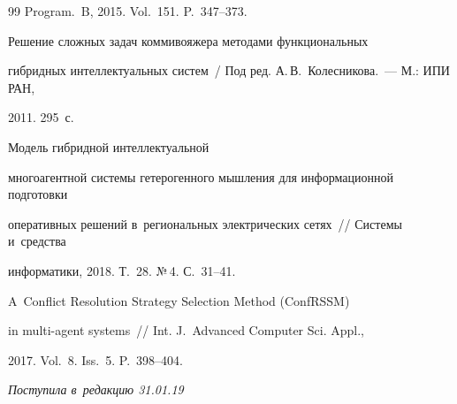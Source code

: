 {{\begin{thebibliography}{99}
  Program.~B, 2015. Vol.~151. P.~347--373.




   Решение сложных задач коммивояжера методами функциональных 


гиб\-рид\-ных интеллектуальных систем~/ Под ред. А.\,В.~Колесникова.~--- М.: ИПИ РАН, 


2011. 295~с.




   Модель гибридной интеллектуальной 


многоагентной системы гетерогенного мышления для информационной подготовки 


оперативных решений в~региональных электрических сетях~/\!\!/ Системы и~средства 


информатики, 2018. Т.~28. №\,4. С.~31--41.




   A~Conflict Resolution Strategy Selection Method (ConfRSSM) 


in multi-agent systems~/\!\!/ Int. J.~Advanced Computer Sci. Appl., 


2017. Vol.~8. Iss.~5. P.~398--404.


        \end{thebibliography}


} }








\vspace*{-3pt}





\hfill{\small\textit{Поступила в~редакцию 31.01.19}}





























